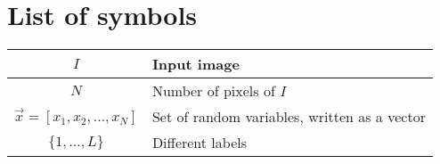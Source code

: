 \chapter{List of symbols}
    \begin{table}[h]
        \centering
        \begin{tabular}{|c|l|}
            \hline
                $I$ & Input image \\
            \hline
                $N$ & Number of pixels of $I$ \\
            \hline
                $\vec x = [x_1,x_2,...,x_N]$ & Set of random variables, written as a vector\\
            \hline
                $\{1,...,L\}$ & Different labels \\
            \hline
        \end{tabular}
    \end{table}